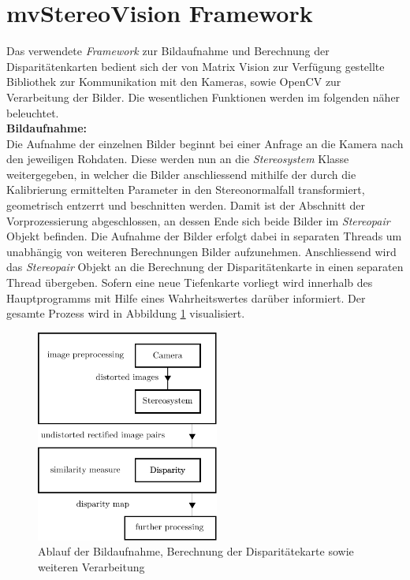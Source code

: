 \section{mvStereoVision Framework}
\label{sec:framework}
Das verwendete \emph{Framework} zur Bildaufnahme und Berechnung der Disparitätenkarten bedient sich der von Matrix Vision zur Verfügung gestellte Bibliothek \cite{matrixvision} zur Kommunikation mit den Kameras, sowie OpenCV \cite{opencv} zur Verarbeitung der Bilder. Die wesentlichen Funktionen werden im folgenden näher beleuchtet.\\

\noindent
\textbf{Bildaufnahme:}\\
Die Aufnahme der einzelnen Bilder beginnt bei einer Anfrage an die Kamera nach den jeweiligen Rohdaten. Diese werden nun an die \emph{Stereosystem} Klasse weitergegeben, in welcher die Bilder anschliessend mithilfe der durch die Kalibrierung ermittelten Parameter in den Stereonormalfall transformiert, geometrisch entzerrt und beschnitten werden. Damit ist der Abschnitt der Vorprozessierung abgeschlossen, an dessen Ende sich beide Bilder im \emph{Stereopair} Objekt befinden. Die Aufnahme der Bilder erfolgt dabei in separaten Threads um unabhängig von weiteren Berechnungen Bilder aufzunehmen. Anschliessend wird das \textit{Stereopair} Objekt an die Berechnung der Disparitätenkarte in einen separaten Thread übergeben. Sofern eine neue Tiefenkarte vorliegt wird innerhalb des Hauptprogramms mit Hilfe eines Wahrheitswertes darüber informiert. Der gesamte Prozess wird in Abbildung \ref{fig:framework_pipeline} visualisiert.\\
 
\begin{figure}[h]
	\begin{center}
		\includegraphics[width=6cm]{img/framework_pipeline.pdf}
	\end{center}
	\caption{Ablauf der Bildaufnahme, Berechnung der Disparitätekarte sowie weiteren Verarbeitung}
	\label{fig:framework_pipeline}
\end{figure}


